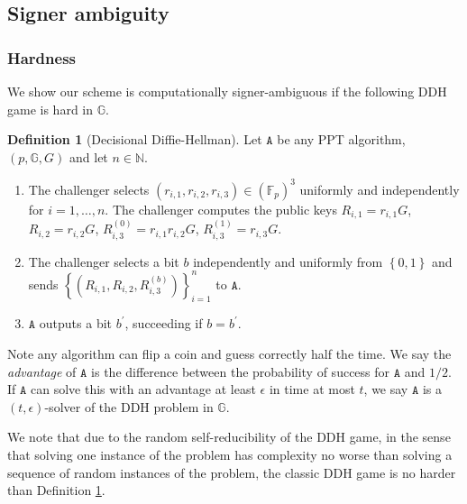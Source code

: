 \documentclass{mrl}
\theoremstyle{plain}
\theoremstyle{definition}
\newtheorem{definition}{Definition}[section]
\begin{document}
\subsection{Signer ambiguity}
\subsubsection{Hardness}

We show our scheme is computationally signer-ambiguous if the following DDH game is hard in $\mathbb{G}$.

\begin{definition}[Decisional Diffie-Hellman]\label{ddhgame} Let $\texttt{A}$ be any PPT algorithm, $(p, \mathbb{G}, G)$ and let $n \in \mathbb{N}$.
\begin{enumerate}
\item The challenger selects $(r_{i,1}, r_{i,2}, r_{i,3}) \in \left(\mathbb{F}_p\right)^3$ uniformly and independently for $i=1, \ldots, n$. The challenger computes the public keys $R_{i,1} = r_{i,1} G$, $R_{i,2} = r_{i,2}G$, $R_{i,3}^{(0)} = r_{i,1} r_{i,2} G$, $R_{i,3}^{(1)} = r_{i,3} G$.

\item The challenger selects a bit $b$ independently and uniformly from $\left\{0,1\right\}$ and sends $\left\{(R_{i,1}, R_{i,2}, R_{i,3}^{(b)})\right\}_{i=1}^{n}$ to $\texttt{A}$.

\item $\texttt{A}$ outputs a bit $b^\prime$, succeeding if $b = b^\prime$.
\end{enumerate}

Note any algorithm can flip a coin and guess correctly half the time. We say the \textit{advantage} of $\texttt{A}$ is the difference between the probability of success for $\texttt{A}$ and $1/2$. If $\texttt{A}$ can solve this with an advantage at least $\epsilon$ in time at most $t$, we say $\texttt{A}$ is a $(t,\epsilon)$-solver of the DDH problem in $\mathbb{G}$. 
\end{definition}

We note that due to the random self-reducibility of the DDH game, in the sense that solving one instance of the problem has complexity no worse than solving a sequence of random instances of the problem, the classic DDH game is no harder than Definition \ref{ddhgame}.
\end{document}
